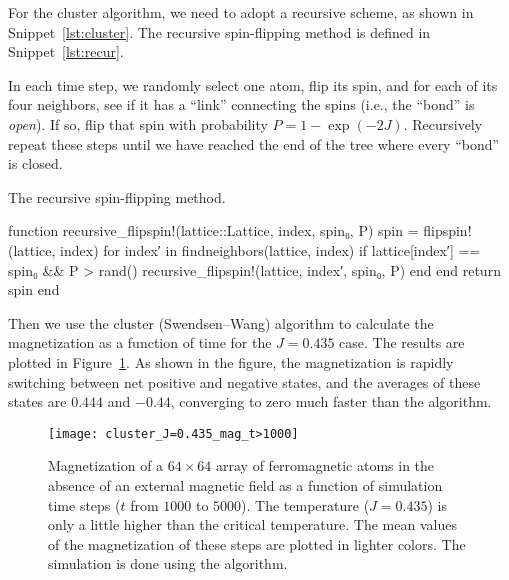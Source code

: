 For the cluster algorithm, we need to adopt a recursive scheme, as shown in
Snippet~\ref{lst:cluster}. The recursive spin-flipping method is defined in
Snippet~\ref{lst:recur}.

In each time step, we randomly select one atom, flip its spin, and for each of its four
neighbors, see if it has a ``link'' connecting the spins (i.e., the ``bond'' is \emph{open}).
If so, flip that spin with probability \(P = 1 - \exp(-2J)\).
Recursively repeat these steps until we have reached the end of the tree where
every ``bond'' is closed.

\begin{algorithm}[H]
    \caption{The recursive spin-flipping method.}
    \label{lst:recur}
    \begin{juliacode}
        function recursive_flipspin!(lattice::Lattice, index, spin₀, P)
            spin = flipspin!(lattice, index)
            for index′ in findneighbors(lattice, index)
                if lattice[index′] == spin₀ && P > rand()
                    recursive_flipspin!(lattice, index′, spin₀, P)
                end
            end
            return spin
        end
    \end{juliacode}
\end{algorithm}

Then we use the cluster (Swendsen--Wang) algorithm to calculate the magnetization as a
function of time for the \(J = 0.435\) case. The results are plotted in
Figure~\ref{fig:mag_J=0.435_cluster}. As shown in the figure, the magnetization is rapidly
switching between net positive and negative states, and the averages of these states are
\(0.444\) and \(-0.44\), converging to zero much faster than the  algorithm.

\begin{figure}[hbt]
    \centering
    \texttt{[image: cluster\_J=0.435\_mag\_t>1000]}
    \caption{Magnetization of a \(64 \times 64\) array of ferromagnetic atoms in the absence
        of an external magnetic field as a function of simulation time steps (\(t\) from
        \(1000\) to \(5000\)). The temperature (\(J = 0.435\)) is only a little higher than
        the critical temperature. The mean values of the magnetization of these steps are
        plotted in lighter colors. The simulation is done using the 
        algorithm.}
    \label{fig:mag_J=0.435_cluster}
\end{figure}
